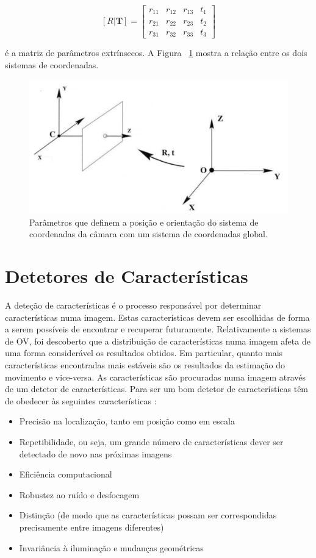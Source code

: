 \[ [\textit{R}|\textbf{T}] = \left[ \begin{array}{cccc}
r_{11} & r_{12} & r_{13} & t_1 \\ 
r_{21} & r_{22} & r_{23} & t_2 \\ 
r_{31} & r_{32} & r_{33} & t_3
\end{array} \right] \]

é a matriz de parâmetros extrínsecos. A Figura ~\ref{fig:parExt} mostra a relação entre os dois sistemas de coordenadas.

\begin{figure}[h!]
	\centering
	\includegraphics[width=0.7\linewidth]{figures/parExt}
	\caption{Parâmetros que definem a posição e orientação do sistema de coordenadas da câmara com um sistema de coordenadas global.}
	\label{fig:parExt}
\end{figure}


\section{Detetores de Características}\label{detCar}

A deteção de características é o processo responsável por determinar características numa imagem. Estas características devem ser escolhidas de forma a serem possíveis de encontrar e recuperar futuramente. Relativamente a sistemas de OV, foi descoberto que a distribuição de características numa imagem afeta de uma forma considerável os resultados obtidos. Em particular, quanto mais características encontradas mais estáveis são os resultados da estimação do movimento e vice-versa. As características são procuradas numa imagem através de um detetor de características. Para ser um bom detetor de características têm de obedecer às seguintes características \cite{Fraundorfer2012}:
\begin{itemize}
	\item Precisão na localização, tanto em posição como em escala
	\item Repetibilidade, ou seja, um grande número de características dever ser detectado de novo nas próximas imagens
	\item Eficiência computacional
	\item Robustez ao ruído e desfocagem
	\item Distinção (de modo que as características possam ser correspondidas precisamente entre imagens diferentes)
	\item Invariância à iluminação e mudanças geométricas
\end{itemize}

